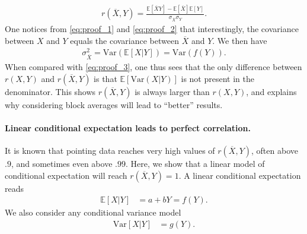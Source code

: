 \documentclass[acmlarge, manuscript,review]{acmart}
\begin{document}
\begin{align}
	r(\overline{X},Y) = \frac{\mathbb{E}[\overline{X}Y] - \mathbb{E}[\overline{X}]\mathbb{E}[Y]}{\sigma_{\overline{X}} \sigma_Y}.
\end{align}
One notices from \autoref{eq:proof_1} and \autoref{eq:proof_2} that interestingly, the covariance between $X$ and $Y$ equals the covariance between $\overline{X}$ and $Y$. We then have
\begin{align}
	\sigma_{\overline{X}}^2 = \text{Var}(\mathbb{E}[X|Y]) = \text{Var}(f(Y)).
\end{align}
When compared with \autoref{eq:proof_3}, one thus sees that the only difference between $r(X,Y)$ and $r(\overline{X},Y)$ is that $\mathbb{E}[\text{Var}(X|Y)]$ is not present in the denominator. This shows $r(\overline{X},Y)$ is always larger than $r(X,Y)$, and explains why considering block averages will lead to ``better'' results.

\paragraph{Linear conditional expectation leads to perfect correlation.}
It is known that pointing data reaches very high values of $r(\overline{X},Y)$, often above $.9$, and sometimes even above $.99$. Here, we show that a linear model of conditional expectation will reach $r(\overline{X},Y) = 1$.
A linear conditional expectation reads
\begin{align}
	\mathbb{E}[X|Y] & = a + b Y  = f(Y).
\end{align}
We also consider any conditional variance model
\begin{align}
	\text{Var}[X|Y] & = g(Y).
\end{align}
\end{document}
